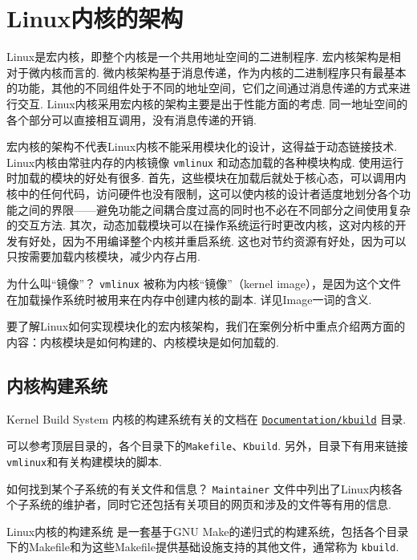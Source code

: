\section{Linux内核的架构}
Linux是宏内核，即整个内核是一个共用地址空间的二进制程序.
宏内核架构是相对于微内核而言的.
微内核架构基于消息传递，作为内核的二进制程序只有最基本的功能，其他的不同组件处于不同的地址空间，它们之间通过消息传递的方式来进行交互.
Linux内核采用宏内核的架构主要是出于性能方面的考虑.\cite{silberschatz2021operating}
同一地址空间的各个部分可以直接相互调用，没有消息传递的开销.

宏内核的架构不代表Linux内核不能采用模块化的设计，这得益于动态链接技术.
Linux内核由常驻内存的内核镜像 \lstinline{vmlinux}%
和动态加载的各种模块构成.
使用运行时加载的模块的好处有很多.
首先，这些模块在加载后就处于核心态，可以调用内核中的任何代码，访问硬件也没有限制，这可以使内核的设计者适度地划分各个功能之间的界限——避免功能之间耦合度过高的同时也不必在不同部分之间使用复杂的交互方法.
其次，动态加载模块可以在操作系统运行时更改内核，这对内核的开发有好处，因为不用编译整个内核并重启系统.
这也对节约资源有好处，因为可以只按需要加载内核模块，减少内存占用.

\begin{qbox}{为什么叫“镜像”？}
	\lstinline{vmlinux} 被称为内核“镜像”（kernel image），是因为这个文件在加载操作系统时被用来在内存中创建内核的副本.
	详见Image一词的含义\cite{imageWik70:online}.
\end{qbox}

要了解Linux如何实现模块化的宏内核架构，我们在案例分析中重点介绍两方面的内容：内核模块是如何构建的、内核模块是如何加载的.

\subsection{内核构建系统} \label{kbuild}
\begin{readsrcbox}{Kernel Build System}
	内核的构建系统有关的文档在 \href{https://docs.kernel.org/kbuild/index.html}{\lstinline{Documentation/kbuild}} 目录.

	可以参考顶层目录的，各个目录下的\lstinline{Makefile}、\lstinline{Kbuild}.
	另外，目录下有用来链接 \lstinline{vmlinux}和有关构建模块的脚本.
\end{readsrcbox}
\begin{qbox}{如何找到某个子系统的有关文件和信息？}
	\lstinline{Maintainer} 文件中列出了Linux内核各个子系统的维护者，同时它还包括有关项目的网页和涉及的文件等有用的信息.
\end{qbox}
Linux内核的构建系统%
是一套基于GNU Make的递归式的构建系统，包括各个目录下的Makefile和为这些Makefile提供基础设施支持的其他文件，通常称为 \lstinline{kbuild}. \cite{LinuxKer71:online}


